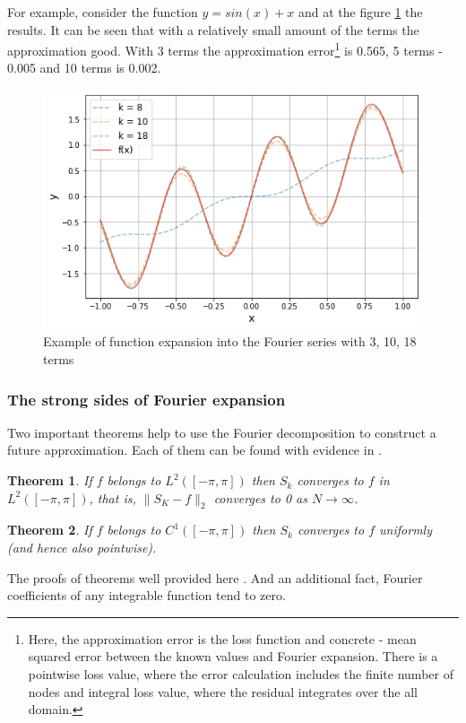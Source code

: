 For example, consider the function $y = sin(x) + x$ and at the figure \ref{fig:fourier_demo} the results. It can be seen that with a relatively small amount of the terms the approximation good. With 3 terms the approximation error\footnote{Here, the approximation error is the loss function and concrete - mean squared error between the known values and Fourier expansion. There is a pointwise loss value, where the error calculation includes the finite number of nodes and integral loss value, where the residual integrates over the all domain.} is 0.565, 5 terms - 0.005 and 10 terms is 0.002.
\begin{figure}[h]
	\centering
	\includegraphics[width=\textwidth]{images/chapter2/fourier_demo.png}
	\caption{Example of function expansion into the Fourier series with 3, 10, 18 terms}
	\label{fig:fourier_demo}
\end{figure}

\subsubsection{The strong sides of Fourier expansion}
Two important theorems help to use the Fourier decomposition to construct a future approximation. Each of them can be found with evidence in \cite{fourierintro}.
\newtheorem{theorem}{Theorem}[chapter]
\begin{theorem}
\label{convergence-l2-norm}
If $f$ belongs to $L^{2}(\left[-\pi ,\pi \right])$ then $S_k$ converges to $f$ in $L^{2}(\left[-\pi ,\pi \right])$, that is, $\|S_K - f\|_{2}$ converges to 0 as $N \rightarrow \infty$.
\end{theorem}
\begin{theorem}
\label{convergence-pointwise}
If $f$ belongs to $C^1(\left[-\pi ,\pi \right])$ then $S_k$ converges to $f$ uniformly (and hence also pointwise).
\end{theorem}
The proofs of theorems well provided here \cite{fourierintro}. And an additional fact, Fourier coefficients of any integrable function tend to zero.

